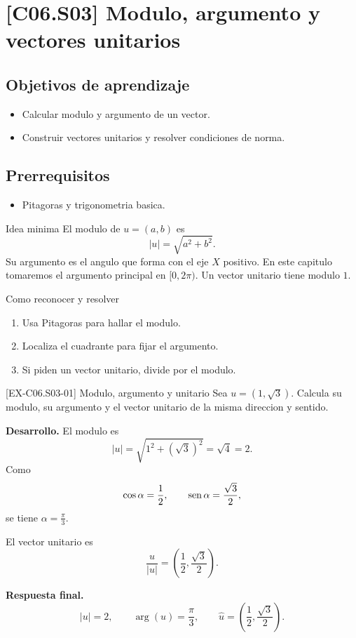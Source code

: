 \section{[C06.S03] Modulo, argumento y vectores unitarios}

\subsection*{Objetivos de aprendizaje}
\begin{itemize}
  \item Calcular modulo y argumento de un vector.
  \item Construir vectores unitarios y resolver condiciones de norma.
\end{itemize}

\subsection*{Prerrequisitos}
\begin{itemize}
  \item Pitagoras y trigonometria basica.
\end{itemize}

\begin{theorybox}{Idea minima}
El modulo de \(u=(a,b)\) es
\[
|u|=\sqrt{a^2+b^2}.
\]
Su argumento es el angulo que forma con el eje \(X\) positivo. En este capitulo tomaremos el
argumento principal en \([0,2\pi)\). Un vector unitario tiene modulo \(1\).
\end{theorybox}

\begin{methodbox}{Como reconocer y resolver}
\begin{enumerate}
  \item Usa Pitagoras para hallar el modulo.
  \item Localiza el cuadrante para fijar el argumento.
  \item Si piden un vector unitario, divide por el modulo.
\end{enumerate}
\end{methodbox}

\begin{solvedexample}{[EX-C06.S03-01] Modulo, argumento y unitario}
Sea \(u=(1,\sqrt{3})\). Calcula su modulo, su argumento y el vector unitario de la misma
direccion y sentido.

\textbf{Desarrollo.} El modulo es
\[
|u|=\sqrt{1^2+(\sqrt{3})^2}=\sqrt{4}=2.
\]
Como
\[
\cos \alpha=\frac{1}{2},
\qquad
\operatorname{sen} \alpha=\frac{\sqrt{3}}{2},
\]
se tiene \(\alpha=\frac{\pi}{3}\).

El vector unitario es
\[
\frac{u}{|u|}=\left(\frac{1}{2},\frac{\sqrt{3}}{2}\right).
\]

\textbf{Respuesta final.}
\[
|u|=2,
\qquad
\arg(u)=\frac{\pi}{3},
\qquad
\widehat{u}=\left(\frac{1}{2},\frac{\sqrt{3}}{2}\right).
\]
\end{solvedexample}

